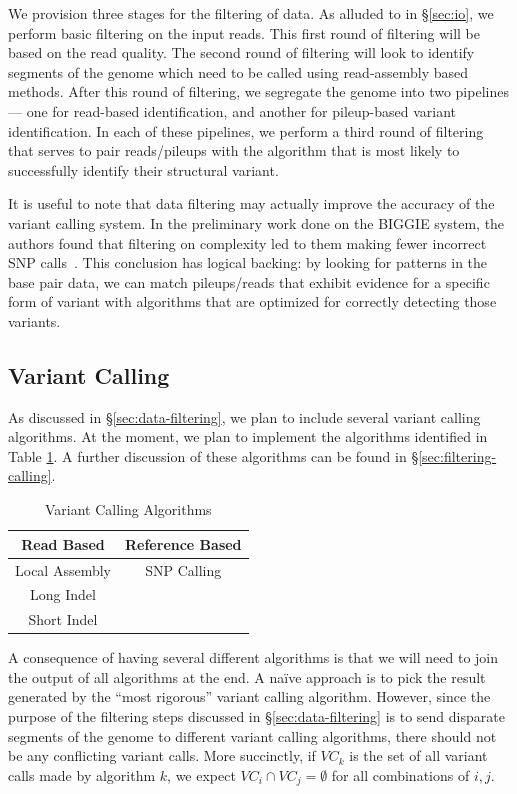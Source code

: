 \documentclass[11pt]{article}
\begin{document}
We provision three stages for the filtering of data. As alluded to in \S\ref{sec:io}, we perform basic filtering on the input reads.
This first round of filtering will be based on the read quality. The second round of filtering will look to identify segments of the
genome which need to be called using read-assembly based methods. After this round of filtering, we segregate the genome
into two pipelines --- one for read-based identification, and another for pileup-based variant identification. In each of these
pipelines, we perform a third round of filtering that serves to pair reads/pileups with the algorithm that is most likely to successfully
identify their structural variant.

It is useful to note that data filtering may actually improve the accuracy of the variant calling system. In the preliminary work
done on the BIGGIE system, the authors found that filtering on complexity led to them making fewer incorrect SNP
calls~\cite{xia12}. This conclusion has logical backing: by looking for patterns in the base pair data, we can match
pileups/reads that exhibit evidence for a specific form of variant with algorithms that are optimized for correctly detecting
those variants.

\subsection{Variant Calling}
\label{sec:variant-calling}

As discussed in \S\ref{sec:data-filtering}, we plan to include several variant calling algorithms. At the moment, we plan to
implement the algorithms identified in Table \ref{tab:vc-algorithms}. A further discussion of these algorithms can be found
in \S\ref{sec:filtering-calling}.

\begin{table}[h]
\begin{center}
\caption{Variant Calling Algorithms}
\label{tab:vc-algorithms}
\begin{tabular}{| c | c |}
\hline
\bf Read Based & \bf Reference Based \\
\hline \hline
Local Assembly & SNP Calling \\
Long Indel & \\
Short Indel & \\
\hline
\end{tabular}
\end{center}
\end{table}

A consequence of having several different algorithms is that we will need to join the output of all algorithms at the end.
A na\"{i}ve approach is to pick the result generated by the ``most rigorous'' variant calling algorithm. However, since the
purpose of the filtering steps discussed in \S\ref{sec:data-filtering} is to send disparate segments of the genome to
different variant calling algorithms, there should not be any conflicting variant calls. More succinctly, if $VC_{k}$ is the
set of all variant calls made by algorithm $k$, we expect $VC_{i} \cap VC_{j} = \emptyset$ for all combinations of $i, j$.
\end{document}

